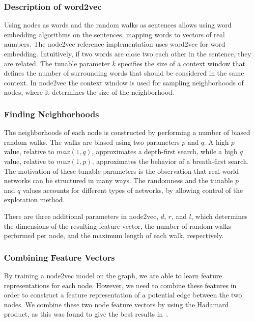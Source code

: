 \subsubsection{Description of word2vec}
Using nodes as words and the random walks as sentences allows using word embedding algorithms on the sentences, mapping words to vectors of real numbers. The node2vec reference implementation uses word2vec for word embedding. Intuitively, if two words are close two each other in the sentence, they are related. The tunable parameter $k$ specifies the size of a context window that defines the number of surrounding words that should be considered in the same context. In node2vec the context window is used for sampling neighborhoods of nodes, where it determines the size of the neighborhood.

\subsubsection{Finding Neighborhoods}
The neighborhoods of each node is constructed by performing a number of biased random walks. The walks are biased using two parameters $p$ and $q$. A high $p$ value, relative to $max(1,q)$, approximates a depth-first search, while a high $q$ value, relative to $max(1,p)$, approximates the behavior of a breath-first search. The motivation of these tunable parameters is the observation that real-world networks can be structured in many ways. The randomness and the tunable $p$ and $q$ values accounts for different types of networks, by allowing control of the exploration method.

There are three additional parameters in node2vec, $d$, $r$, and $l$, which determines the dimensions of the resulting feature vector, the number of random walks performed per node, and the maximum length of each walk, respectively.

\subsubsection{Combining Feature Vectors}
By training a node2vec model on the graph, we are able to learn feature representations for each node. However, we need to combine these features in order to construct a feature representation of a potential edge between the two nodes. We combine these two node feature vectors by using the Hadamard product, as this was found to give the best results in~\cite{node2vec}.

